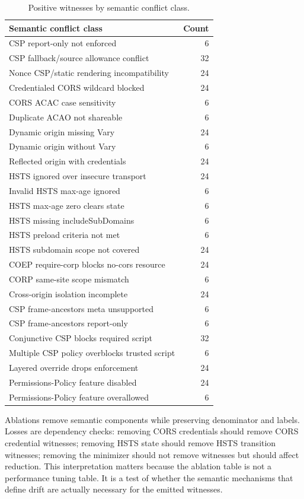 \documentclass[10pt,conference]{IEEEtran}
\begin{document}
\begin{table}[t]
\centering
\caption{Positive witnesses by semantic conflict class.}
\label{tab:supp-issues}
\begin{tabular}{lr}
\toprule
Semantic conflict class & Count \\
\midrule
CSP report-only not enforced & 6 \\
CSP fallback/source allowance conflict & 32 \\
Nonce CSP/static rendering incompatibility & 24 \\
Credentialed CORS wildcard blocked & 24 \\
CORS ACAC case sensitivity & 6 \\
Duplicate ACAO not shareable & 6 \\
Dynamic origin missing Vary & 24 \\
Dynamic origin without Vary & 6 \\
Reflected origin with credentials & 24 \\
HSTS ignored over insecure transport & 24 \\
Invalid HSTS max-age ignored & 6 \\
HSTS max-age zero clears state & 6 \\
HSTS missing includeSubDomains & 6 \\
HSTS preload criteria not met & 6 \\
HSTS subdomain scope not covered & 24 \\
COEP require-corp blocks no-cors resource & 24 \\
CORP same-site scope mismatch & 6 \\
Cross-origin isolation incomplete & 24 \\
CSP frame-ancestors meta unsupported & 6 \\
CSP frame-ancestors report-only & 6 \\
Conjunctive CSP blocks required script & 32 \\
Multiple CSP policy overblocks trusted script & 6 \\
Layered override drops enforcement & 24 \\
Permissions-Policy feature disabled & 24 \\
Permissions-Policy feature overallowed & 6 \\
\bottomrule
\end{tabular}
\end{table}

Ablations remove semantic components while preserving denominator and labels. Losses are dependency checks: removing CORS credentials should remove CORS credential witnesses; removing HSTS state should remove HSTS transition witnesses; removing the minimizer should not remove witnesses but should affect reduction. This interpretation matters because the ablation table is not a performance tuning table. It is a test of whether the semantic mechanisms that define drift are actually necessary for the emitted witnesses.
\end{document}
